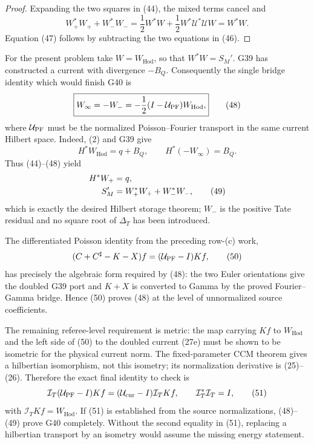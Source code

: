 \documentclass[11pt]{article}
\newcommand{\Hod}{\mathrm{Hod}}
\begin{document}
\begin{proof}
Expanding the two squares in (44), the mixed terms cancel and
\[
 W_+^*W_++W_-^*W_-
 =\frac12W^*W+\frac12W^*\mathcal U^*\mathcal UW=W^*W.
\]
Equation (47) follows by subtracting the two equations in (46).
\end{proof}

For the present problem take $W=W_{\Hod}$, so that $W^*W=S_M'$.  G39 has
constructed a current with divergence $-B_Q$.  Consequently the single bridge
identity which would finish G40 is
\begin{equation}
 \boxed{
 W_\infty=-W_-
 =-\frac12(I-\mathcal U_{\rm PF})W_{\Hod},}             \tag{48}
\end{equation}
where $\mathcal U_{\rm PF}$ must be the normalized Poisson--Fourier transport
in the same current Hilbert space.  Indeed, (2) and G39 give
\[
 H^*W_{\Hod}=q+B_Q,\qquad H^*(-W_\infty)=B_Q.
\]
Thus (44)--(48) yield
\begin{align}
 H^*W_+&=q,\notag\\
 S_M'&=W_+^*W_++W_-^*W_-,                              \tag{49}
\end{align}
which is exactly the desired Hilbert storage theorem; $W_-$ is the positive
Tate residual and no square root of $\Delta_T$ has been introduced.

The differentiated Poisson identity from the preceding row-(c) work,
\begin{equation}
 (C+C^\sharp-K-X)f=(\mathcal U_{\rm PF}-I)Kf,           \tag{50}
\end{equation}
has precisely the algebraic form required by (48): the two Euler orientations
give the doubled G39 port and $K+X$ is converted to Gamma by the proved
Fourier--Gamma bridge.  Hence (50) proves (48) at the level of unnormalized
source coefficients.

The remaining referee-level requirement is metric: the map carrying $Kf$ to
$W_{\Hod}$ and the left side of (50) to the doubled current (27e) must be shown
to be isometric for the physical current norm.  The fixed-parameter CCM
theorem gives a hilbertian isomorphism, not this isometry; its normalization
derivative is (25)--(26).  Therefore the exact final identity to check is
\begin{equation}
 \mathcal I_T(\mathcal U_{\rm PF}-I)Kf
 =(\mathcal U_{\rm cur}-I)\mathcal I_TKf,\qquad
 \mathcal I_T^*\mathcal I_T=I,                          \tag{51}
\end{equation}
with $\mathcal I_TKf=W_{\Hod}$.  If (51) is established from the source
normalizations, (48)--(49) prove G40 completely.  Without the second equality
in (51), replacing a hilbertian transport by an isometry would assume the
missing energy statement.
\end{document}
